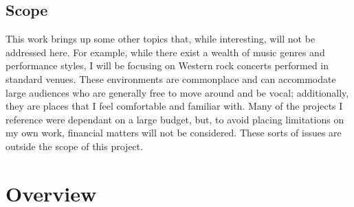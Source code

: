 \subsection{Scope}

This work brings up some other topics that, while interesting, will not be addressed here. For example, while there exist a wealth of music genres and performance styles, I will be focusing on Western rock concerts performed in standard venues. These environments are commonplace and can accommodate large audiences who are generally free to move around and be vocal; additionally, they are places that I feel comfortable and familiar with. Many of the projects I reference were dependant on a large budget, but, to avoid placing limitations on my own work, financial matters will not be considered. These sorts of issues are outside the scope of this project.


\section{Overview}

